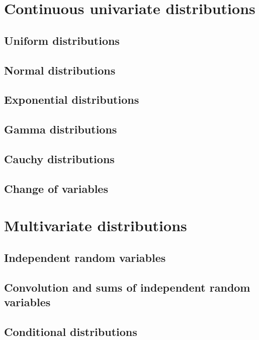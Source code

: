 \documentclass[11pt]{article}
\theoremstyle{definition}
\theoremstyle{plain}
\theoremstyle{remark}
\begin{document}
\section{Continuous univariate distributions}

\subsection{Uniform distributions}

\subsection{Normal distributions}

\subsection{Exponential distributions}

\subsection{Gamma distributions}

\subsection{Cauchy distributions}

\subsection{Change of variables}

\section{Multivariate distributions}

\subsection{Independent random variables}

\subsection{Convolution and sums of independent random variables}

\subsection{Conditional distributions}
\end{document}
